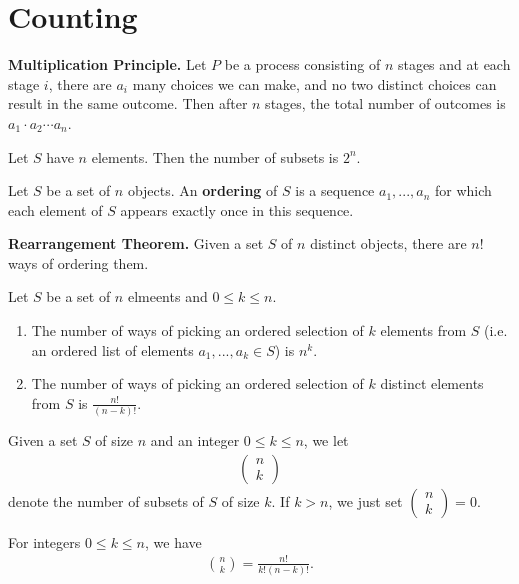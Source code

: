 \documentclass{article}
\begin{document}
\section{Counting}
\begin{theorem}
	\textbf{Multiplication Principle.} Let $P$ be a process consisting of $n$ stages and at each stage $i$, there are $a_i$ many choices we can make, and no two distinct choices can result in the same outcome.
	Then after $n$ stages, the total number of outcomes is $a_1\cdot a_2\cdots a_n$.
\end{theorem}
\begin{proposition}
	Let $S$ have $n$ elements. Then the number of subsets is $2^n$.
\end{proposition}
\begin{definition}
	Let $S$ be a set of $n$ objects. An \textbf{ordering} of $S$ is a sequence $a_1,...,a_n$ for which each element of $S$ appears exactly once in this sequence.
\end{definition}
\begin{theorem}
	\textbf{Rearrangement Theorem.} Given a set $S$ of $n$ distinct objects, there are $n!$ ways of ordering them.
\end{theorem}
\begin{proposition}
	Let $S$ be a set of $n$ elmeents and $0\leq k \leq n$.
	\begin{enumerate}
		\item The number of ways of picking an ordered selection of $k$ elements from $S$ (i.e. an ordered list of elements $a_1, ..., a_k\in S$) is $n^k$.
		\item The number of ways of picking an ordered selection of $k$ distinct elements from $S$ is $\frac{n!}{(n-k)!}$.
	\end{enumerate}
\end{proposition}
\begin{definition}
	Given a set $S$ of size $n$ and an integer $0\leq k \leq n$, we let
	\begin{align*}
		\begin{pmatrix}
			n \\k
		\end{pmatrix}
	\end{align*}
	denote the number of subsets of $S$ of size $k$. If $k>n$, we just set $\begin{pmatrix}
			n \\k
		\end{pmatrix}=0$.
\end{definition}
\begin{theorem}
	For integers $0\leq k \leq n$, we have
	\begin{align*}
		\binom{n}{k}=\frac{n!}{k!(n-k)!}.
	\end{align*}
\end{theorem}
\end{document}
